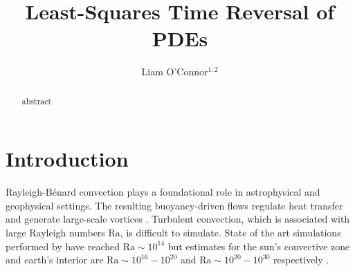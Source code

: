 \documentclass[longbibliography,twocolumn,amsmath,amssymb,aps,nofootinbib]{revtex4-2}
\newcommand\Ra{\mathrm{Ra}}
\renewcommand{\vec}[1]{\boldsymbol{#1}}
\newcommand{\grad}{\vec{\nabla}}
\begin{document}
\title{Least-Squares Time Reversal of PDEs}

\author{Liam O'Connor$^{1,2}$}

\begin{abstract}
    abstract
\end{abstract}

\maketitle

\section{Introduction}
Rayleigh-B\'enard convection plays a foundational role in astrophysical and geophysical settings.
The resulting buoyancy-driven flows regulate heat transfer and generate large-scale vortices \cite{Couston}.
Turbulent convection, which is associated with large Rayleigh numbers $\Ra$, is difficult to simulate. 
State of the art simulations performed by \cite{Zhu_2018} have reached $\Ra \sim 10^{14}$ but estimates for the sun's convective zone and earth's interior are $\Ra \sim 10^{16}-10^{20}$ and $\Ra \sim 10^{20}-10^{30}$ respectively \cite{Ossendrijver,Gubbins_2001}. 





\end{document}
